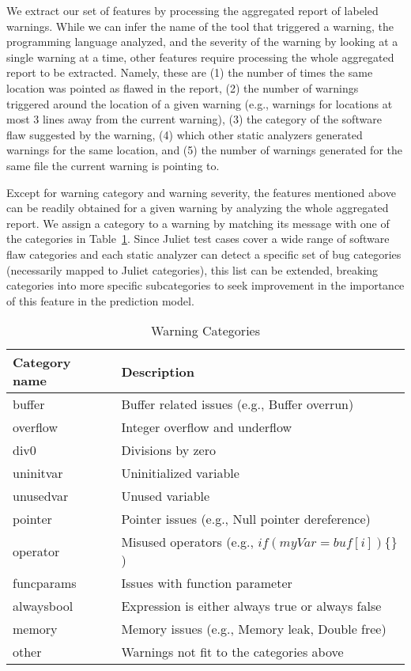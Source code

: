 We extract our set of features by processing the aggregated report of labeled
warnings.
While we can infer the name of the tool that triggered a warning, the programming
language analyzed, and the severity of the warning by looking
at a single warning at a time,
other features require processing the whole
aggregated report to be extracted. Namely, these are (1) the number of times the same
location was pointed as flawed in the report, (2) the number of warnings triggered
around the location of a given warning (e.g., warnings for locations at most 3
lines away from the current warning), (3) the category of the software flaw
suggested by the warning, (4) which other static analyzers generated warnings for
the same location, and (5) the number of warnings generated for the same file the
current warning is pointing to.

Except for warning category and warning severity, the features
mentioned above can be readily obtained for a given warning by analyzing the
whole aggregated report. We assign a category to a warning by matching its
message with one of the categories in Table~\ref{tab:warning_categories}. Since
Juliet test cases cover a wide range of software flaw categories and each
static analyzer can detect a specific set of bug categories (necessarily mapped
to Juliet categories), this list can be extended, breaking categories into more
specific subcategories to seek improvement in the importance of this feature in
the prediction model.

\begin{table}
  \begin{center}
      \begin{tabular}{ll}\hline
        Category name & Description \\
      \hline
        buffer &  Buffer related issues (e.g., Buffer overrun) \\
        overflow & Integer overflow and underflow \\
        div0 & Divisions by zero \\
        uninitvar & Uninitialized variable \\
        unusedvar & Unused variable \\
        pointer & Pointer issues (e.g., Null pointer dereference) \\
        operator & Misused operators (e.g., $if(myVar = buf[i])\{\}$) \\
        funcparams & Issues with function parameter \\
        alwaysbool & Expression is either always true or always false \\
        memory & Memory issues (e.g., Memory leak, Double free)\\
        other & Warnings not fit to the categories above \\ \hline
      \end{tabular}
      \caption{Warning Categories}\label{tab:warning_categories}
  \end{center}
\end{table}

